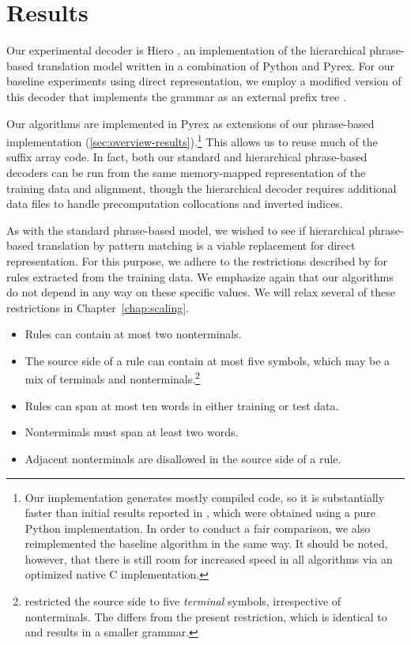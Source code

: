 \section{Results}\label{sec:hiero-results}

Our experimental decoder is Hiero
\citep{Chiang:2007:cl}, an implementation of the hierarchical
phrase-based translation model written in a 
combination of Python and Pyrex.  For our baseline
experiments using direct representation, we employ
a modified version of this decoder \citep{Dyer:2007:iwslt} 
that implements the grammar as an external prefix tree 
\citep{Zens:2007:hlt-naacl}.

Our algorithms are implemented in Pyrex as extensions of
our phrase-based implementation 
(\textsection\ref{sec:overview-results}).\footnote{Our 
implementation generates mostly compiled code, so
it is substantially faster than initial 
results reported in \citet{Lopez:2007:emnlp-conll}, which
were obtained using a pure Python implementation.  In order to conduct
a fair comparison, we also reimplemented the baseline algorithm 
in the same way.  It should be noted, however, that there 
is still room for increased speed in all algorithms via
an optimized native C implementation.}  This allows us to reuse much 
of the suffix array code.  In fact, both our standard and 
hierarchical phrase-based decoders can be run from the
same memory-mapped representation of the training data and alignment, 
though the hierarchical decoder requires additional data files to 
handle precomputation collocations and inverted indices.

As with the standard phrase-based model, we wished to 
see if hierarchical phrase-based translation by pattern matching is a viable
replacement for direct representation.  For this purpose, we
adhere to the restrictions described by \citet{Chiang:2007:cl} for rules
extracted from the training data.  We emphasize again that
our algorithms do not depend in any way on these
specific values.  We will relax several of these 
restrictions in Chapter~\ref{chap:scaling}.

\begin{itemize}
	\item Rules can contain at most two nonterminals.
	\item The source side of a rule can contain at most five symbols, which may be a mix of terminals and nonterminals.\footnote{\citet{Lopez:2007:emnlp-conll} restricted the source side to five {\em terminal} symbols, irrespective of nonterminals.  The differs from the present restriction, which is identical to \citet{Chiang:2007:cl} and results in a smaller grammar.}
	\item Rules can span at most ten words in either training or test data.
	\item Nonterminals must span at least two words.
	\item Adjacent nonterminals are disallowed in the source side of a rule.
\end{itemize}

